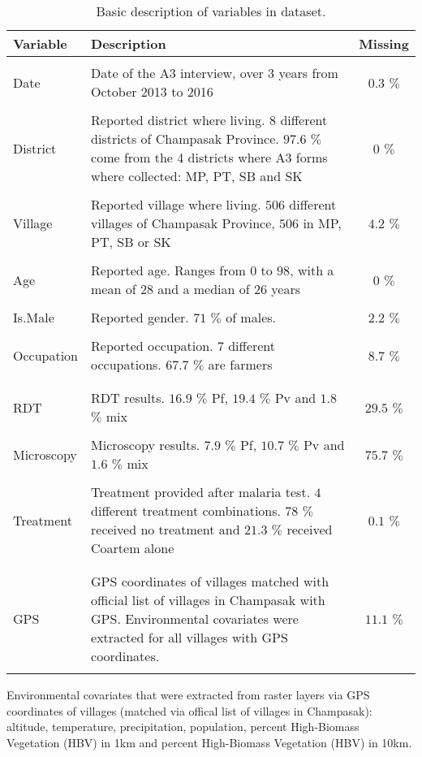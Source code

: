 \documentclass{article}\usepackage[]{graphicx}\usepackage[]{color}
\begin{document}
\begin{table}[htp]
\begin{center}
\begin{tabular}{lp{11cm}c}
Variable & Description & Missing \\ \hline
&& \\
Date & Date of the A3 interview, over 3 years from October 2013 to 2016 & \(0.3\) $\%$ \\
&& \\
District & Reported district where living. \(8\) different districts of Champasak Province. \(97.6\) $\%$ come from the 4 districts where A3 forms where collected: MP, PT, SB and SK & \(0\) $\%$ \\
&& \\
Village & Reported village where living. \(506\) different villages of Champasak Province, \(506\) in MP, PT, SB or SK & \(4.2\) $\%$ \\ 
&& \\
Age & Reported age. Ranges from \(0\) to \(98\), with a mean of \(28\) and a median of \(26\) years & \(0\) $\%$ \\ 
&& \\
Is.Male & Reported gender. \(71\) $\%$ of males. & \(2.2\) $\%$ \\ 
&& \\
Occupation & Reported occupation. \(7\) different occupations. \(67.7\) $\%$ are farmers & \(8.7\) $\%$ \\ 
&& \\ \hline
&& \\
RDT & RDT results. \(16.9\) $\%$ Pf, \(19.4\) $\%$ Pv and \(1.8\) $\%$ mix & \(29.5\) $\%$ \\ 
&& \\
Microscopy & Microscopy results. \(7.9\) $\%$ Pf, \(10.7\) $\%$ Pv and \(1.6\) $\%$ mix & \(75.7\) $\%$ \\ 
&& \\
Treatment & Treatment provided after malaria test. \(4\) different treatment combinations. \(78\) $\%$ received no treatment and \(21.3\) $\%$ received Coartem alone & \(0.1\) $\%$ \\ 
&& \\ \hline
&& \\
GPS & GPS coordinates of villages matched with official list of villages in Champasak with GPS. Environmental covariates were extracted for all villages with GPS coordinates. & \(11.1\) $\%$ \\ 
&& \\ \hline

\end{tabular}
\caption{Basic description of variables in dataset.}
\label{table:Table_Basic_Description}
\end{center}
\end{table}

Environmental covariates that were extracted from raster layers via GPS coordinates of villages (matched via offical list of villages in Champasak): altitude, temperature, precipitation, population, percent High-Biomass Vegetation (HBV) in 1km and percent High-Biomass Vegetation (HBV) in 10km.
\end{document}
